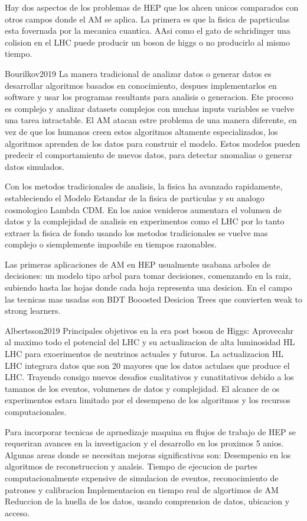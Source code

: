 Hay dos aspectos de los problemas de HEP que los ahcen unicos comparados con otros campos donde el AM se aplica. 
La primera es que la fisica de paprticulas esta fovernada por la mecanica cuantica. AAsi como el gato de schridinger una colision en el LHC puede producir un boson de higgs o no producirlo al mismo tiempo. 


Bourilkov2019
La manera tradicional de analizar datos o generar datos es desarrollar algoritmos basados en conocimiento, despues implementarlos en software y usar los programas resultants para analisis o generacion. Ete proceso es complejo y analizar datasets complejos con muchas inputs variables se vuelve una tarea intractable. El AM atacan estre problema de una manera diferente, en vez de que los humanos creen estos algoritmos altamente especializados, los algoritmos aprenden de los datos para construir el modelo. Estos modelos pueden predecir el comportamiento de nuevos datos, para detectar anomalias o generar datos simulados.

Con los metodos tradicionales de analisis, la fisica ha avanzado rapidamente, estableciendo el Modelo Estandar de la fisica de particulas y su analogo cosmologico Lambda CDM. En los anios venideros aumentara el volumen de datos y la complejidad de analisis en experimentos como el LHC por lo tanto extraer la fisica de fondo usando los metodos tradicionales se vuelve mas complejo o siemplemente imposbile en tiempos razonables.

Las primeras aplicaciones de AM en HEP usualmente usabana arboles de decisiones: un modelo tipo arbol para tomar decisiones, comenzando en la raiz, subiendo hasta las hojas donde cada hoja representa una desicion. En el campo las tecnicas mas usadas son BDT Booosted Desicion Trees que convierten weak to strong learners.



Albertsson2019
Principales objetivos en la era post boson de Higgs:
Aprovecahr al maximo todo el potencial del LHC y su actualizacion de alta luminosidad HL LHC para exoerimentos de neutrinos actuales y futuros.
La actualizacion HL LHC integrara datos que son 20 mayores que los datos actulaes que produce el LHC. Trayendo consigo nuevos desafios cualitativos y cunatitativos debido a los tamanos de los eventos, volumenes de datos y complejidad. 
El alcance de os experimentos estara limitado por el desempeno de los algoritmos y los recursos computacionales.

Para incorporar tecnicas de aprnedizaje maquina en flujos de trabajo de HEP se requeriran avances en la investigacion y el desarrollo en los proximos 5 anios.
Algunas areas donde se necesitan mejoras significativas son:
Desempenio en los algoritmos de reconstruccion y analsis.
Tiempo de ejecucion de partes computacionalmente expensive de simulacion de eventos, reconocimiento de patrones y calibracion
Implementacion en tiempo real de algortimos de AM
Reduccion de la huella de los datos, usando comprension de datos, ubicacion y acceso.

